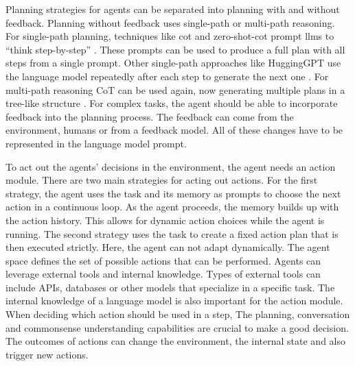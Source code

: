 \documentclass[../main.tex]{subfiles}
\begin{document}
Planning strategies for agents can be separated into planning with and without feedback.
Planning without feedback uses single-path or multi-path reasoning.
For single-path planning, techniques like \gls{cot} and zero-shot-\gls{cot} prompt \glspl{llm}
to ``think step-by-step'' \cite{Wei2022}.
These prompts can be used to produce a full plan with all steps from a single prompt.
Other single-path approaches like HuggingGPT
use the language model repeatedly after each step
to generate the next one \cite{Shen2023}.
For multi-path reasoning CoT can be used again, now generating multiple plans
in a tree-like structure \cite{Yao2023}.
For complex tasks, the agent should be able to incorporate feedback into
the planning process.
The feedback can come from the environment, humans or from a feedback model.
All of these changes have to be represented in the language model prompt.

To act out the agents' decisions in the environment, the agent needs an
action module.
There are two main strategies for acting out actions.
For the first strategy,
the agent uses the task and its memory as prompts
to choose the next action in a continuous loop.
As the agent proceeds, the memory builds up with the action history.
This allows for dynamic action choices while the agent is running.
The second strategy uses the task to create a fixed action plan
that is then executed strictly.
Here, the agent can not adapt dynamically.
The agent space defines the set of possible actions that can be performed.
Agents can leverage external tools and internal knowledge.
Types of external tools can include APIs, databases or other models
that specialize in a specific task.
The internal knowledge of a language model is also important for the action module.
When deciding which action should be used in a step,
The planning, conversation and commonsense understanding capabilities
are crucial to make a good decision.
The outcomes of actions can change the environment, the internal state and
also trigger new actions.
\end{document}
